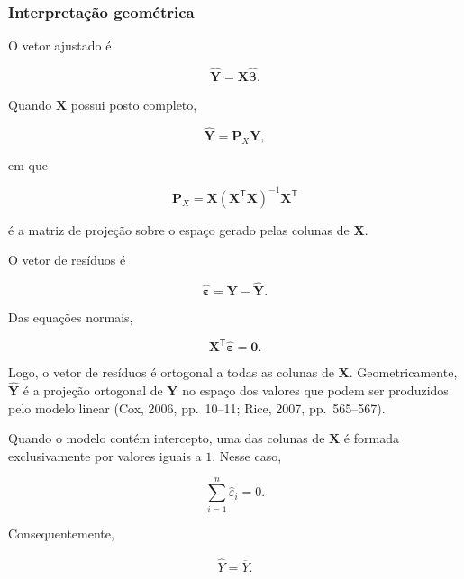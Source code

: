 \documentclass[
  letterpaper,
  DIV=11,
  numbers=noendperiod]{scrreprt}
\begin{document}
\subsubsection{Interpretação
geométrica}\label{interpretauxe7uxe3o-geomuxe9trica}

O vetor ajustado é

\[\widehat{\mathbf{Y}}
=
\mathbf{X}\widehat{\boldsymbol\beta}.\]

Quando \(\mathbf{X}\) possui posto completo,

\[\widehat{\mathbf{Y}}
=
\mathbf{P}_X\mathbf{Y},\]

em que

\[\mathbf{P}_X
=
\mathbf{X}
(\mathbf{X}^\mathsf{T}\mathbf{X})^{-1}
\mathbf{X}^\mathsf{T}\]

é a matriz de projeção sobre o espaço gerado pelas colunas de
\(\mathbf{X}\).

O vetor de resíduos é

\[\widehat{\boldsymbol\varepsilon}
=
\mathbf{Y}-\widehat{\mathbf{Y}}.\]

Das equações normais,

\[\mathbf{X}^\mathsf{T}
\widehat{\boldsymbol\varepsilon}
=
\mathbf{0}.\]

Logo, o vetor de resíduos é ortogonal a todas as colunas de
\(\mathbf{X}\). Geometricamente, \(\widehat{\mathbf{Y}}\) é a projeção
ortogonal de \(\mathbf{Y}\) no espaço dos valores que podem ser
produzidos pelo modelo linear (Cox, 2006, pp.~10--11; Rice, 2007,
pp.~565--567).

\begin{tcolorbox}[enhanced jigsaw, colback=white, leftrule=.75mm, colbacktitle=quarto-callout-note-color!10!white, breakable, titlerule=0mm, bottomtitle=1mm, title=\textcolor{quarto-callout-note-color}{\faInfo}\hspace{0.5em}{Consequência}, colframe=quarto-callout-note-color-frame, toprule=.15mm, opacityback=0, bottomrule=.15mm, opacitybacktitle=0.6, arc=.35mm, toptitle=1mm, rightrule=.15mm, coltitle=black, left=2mm]

Quando o modelo contém intercepto, uma das colunas de \(\mathbf{X}\) é
formada exclusivamente por valores iguais a \(1\). Nesse caso,

\[\sum_{i=1}^n \widehat\varepsilon_i=0.\]

Consequentemente,

\[\overline{\widehat Y}
=
\overline Y.\]

\end{tcolorbox}
\end{document}
